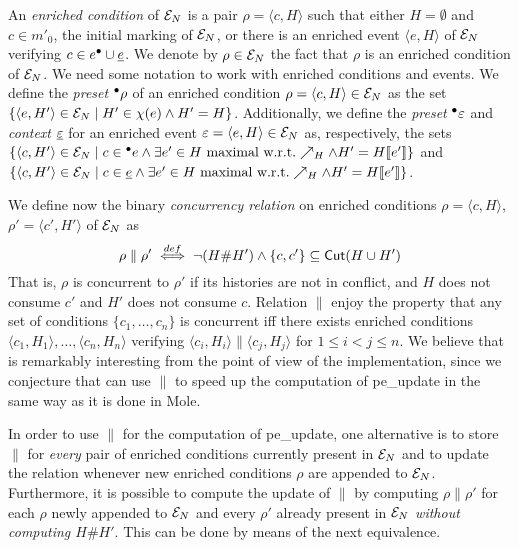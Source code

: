 \documentclass[11pt,a4paper]{article}
\newcommand{\confl}{\ensuremath{\mathord{\#}}}
\newcommand{\peupdate}{\mbox{\sf pe\_update}}
\begin{document}
An \emph{enriched condition} of $\mathcal{E}_{N}$ is a pair $\rho = \langle c, H
\rangle$ such that either $H = \emptyset$ and $c \in m'_0$, the initial marking
of $\mathcal{E}_{N}$, or there is an enriched event $\langle e, H \rangle$ of $\mathcal{E}_{N}$
verifying $c \in e^\bullet \cup \underline{e}$.  We denote by $\rho \in \mathcal{E}_{N}$ the
fact that $\rho$ is an enriched condition of $\mathcal{E}_{N}$.  We need some notation
to work with enriched conditions and events.  We define the \emph{preset} ${}^\bullet\rho$ of an enriched condition $\rho = \langle c, H \rangle \in \mathcal{E}_{N}$ as the
set $\{\langle e, H' \rangle \in \mathcal{E}_{N} \mid H' \in \chi (e) \land H' = H\}$.
Additionally, we define the \emph{preset} ${}^\bullet\varepsilon$ and \emph{context}
$\underline{\varepsilon}$ for an enriched event $\varepsilon = \langle e, H \rangle
\in \mathcal{E}_{N}$ as, respectively, the sets $\{\langle c, H' \rangle \in \mathcal{E}_{N} \mid
c \in {}^\bullet e \land \exists e' \in H \mbox{ maximal w.r.t.} \nearrow_H \land H'
= H [\![ e']\!]\}$ and $\{\langle c, H' \rangle \in \mathcal{E}_{N} \mid c \in \underline{e}
\land \exists e' \in H \mbox{ maximal w.r.t.} \nearrow_H \land H' = H
[\![ e']\!]\}$.

We define now the binary \emph{concurrency relation} on enriched conditions
$\rho = \langle c, H \rangle$, $\rho' = \langle c', H' \rangle$ of $\mathcal{E}_{N}$ as
$$ \rho \parallel \rho' \bydef\iff \lnot (H \confl H') \land \{c, c'\}
\subseteq \cut{H \cup H'}$$  That is, $\rho$ is concurrent to $\rho'$ if its
histories are not in conflict, and $H$ does not consume $c'$ and $H'$ does not
consume $c$.  Relation $\parallel$ enjoy the property that any set of
conditions $\{c_1, \ldots, c_n\}$ is concurrent iff there exists enriched
conditions $\langle c_1, H_1 \rangle, \ldots, \langle c_n, H_n \rangle$
verifying $\langle c_i, H_i \rangle \parallel \langle c_j, H_j \rangle$ for $1
\le i < j \le n$.  We believe that is remarkably interesting from the point of
view of the implementation, since we conjecture that can use $\parallel$ to
speed up the computation of \peupdate{} in the same way as it is done in Mole.

In order to use $\parallel$ for the computation of \peupdate{}, one alternative
is to store $\parallel$ for \emph{every} pair of enriched conditions currently
present in $\mathcal{E}_{N}$ and to update the relation whenever new enriched conditions
$\rho$ are appended to $\mathcal{E}_{N}$.  Furthermore, it is possible to compute the
update of $\parallel$ by computing $\rho \parallel \rho'$ for each $\rho$ newly
appended to $\mathcal{E}_{N}$ and every $\rho'$ already present in $\mathcal{E}_{N}$
\emph{without computing $H \confl H'$}. This can be done by means of the next
equivalence.
\end{document}
